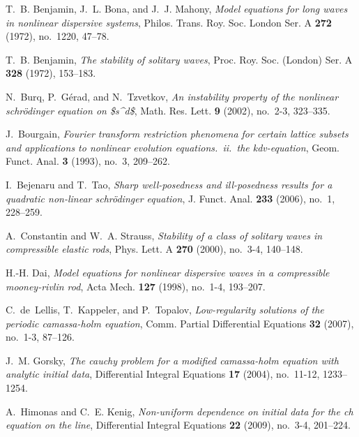 \documentclass[12pt,reqno]{amsart}
\begin{document}
\begin{thebibliography}{dLKT07}

T.~B. Benjamin, J.~L. Bona, and J.~J. Mahony, \emph{Model equations for long
  waves in nonlinear dispersive systems}, Philos. Trans. Roy. Soc. London Ser.
  A \textbf{272} (1972), no.~1220, 47--78.

T.~B. Benjamin, \emph{The stability of solitary waves}, Proc. Roy. Soc.
  (London) Ser. A \textbf{328} (1972), 153--183.

N.~Burq, P.~G{\'e}rad, and N.~Tzvetkov, \emph{An instability property of the
  nonlinear schr{\"o}dinger equation on {\$}s\^{}d{\$}}, Math. Res. Lett.
  \textbf{9} (2002), no.~2-3, 323--335.

J.~Bourgain, \emph{Fourier transform restriction phenomena for certain lattice
  subsets and applications to nonlinear evolution equations.\ ii.\ the
  kdv-equation}, Geom. Funct. Anal. \textbf{3} (1993), no.~3, 209--262.

I.~Bejenaru and T.~Tao, \emph{Sharp well-posedness and ill-posedness results
  for a quadratic non-linear schr{\"o}dinger equation}, J. Funct. Anal.
  \textbf{233} (2006), no.~1, 228--259.

A.~Constantin and W.~A. Strauss, \emph{Stability of a class of solitary waves
  in compressible elastic rods}, Phys. Lett. A \textbf{270} (2000), no.~3-4,
  140--148.

H.-H. Dai, \emph{Model equations for nonlinear dispersive waves in a
  compressible mooney-rivlin rod}, Acta Mech. \textbf{127} (1998), no.~1-4,
  193--207.

C.~de~Lellis, T.~Kappeler, and P.~Topalov, \emph{Low-regularity solutions of
  the periodic camassa-holm equation}, Comm. Partial Differential Equations
  \textbf{32} (2007), no.~1-3, 87--126.

J.~M. Gorsky, \emph{The cauchy problem for a modified camassa-holm equation
  with analytic initial data}, Differential Integral Equations \textbf{17}
  (2004), no.~11-12, 1233--1254.

A.~Himonas and C.~E. Kenig, \emph{Non-uniform dependence on initial data for
  the ch equation on the line}, Differential Integral Equations \textbf{22}
  (2009), no.~3-4, 201--224.


\end{thebibliography}
\end{document}

